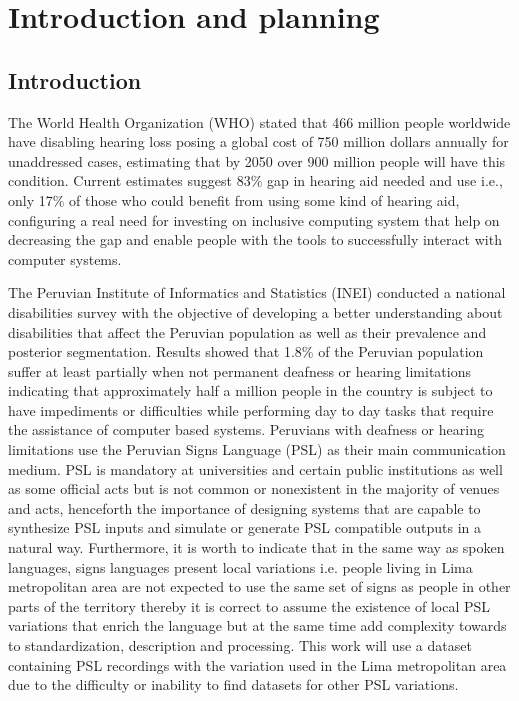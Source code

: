 
\chapter{Introduction and planning} \label{ch-1}

\section{Introduction}

The World Health Organization (WHO) stated that 466 million people worldwide have disabling hearing loss posing a global cost of 750 million dollars annually for unaddressed cases, estimating that by 2050 over 900 million people will have this condition. Current estimates suggest 83\% gap in hearing aid needed and use i.e., only 17\% of those who could benefit from using some kind of hearing aid\cite{deafness_and_hearing_loss_2020}, configuring a real need for investing on inclusive computing system that help on decreasing the gap and enable people with the tools to successfully interact with computer systems.

The Peruvian Institute of Informatics and Statistics (INEI) conducted a national disabilities survey with the objective of developing a better understanding about disabilities that affect the Peruvian population as well as their prevalence and posterior segmentation\cite{disabilities_survey_2012}. Results showed that 1.8\% of the Peruvian population suffer at least partially when not permanent deafness or hearing limitations indicating that approximately half a million people in the country is subject to have impediments or difficulties while performing day to day tasks that require the assistance of computer based systems. Peruvians with deafness or hearing limitations use the Peruvian Signs Language (PSL) as their main communication medium. PSL is mandatory at universities and certain public institutions as well as some official acts but is not common or nonexistent in the majority of venues and acts, henceforth the importance of designing systems that are capable to synthesize PSL inputs and simulate or generate PSL compatible outputs in a natural way. Furthermore, it is worth to indicate that in the same way as spoken languages, signs languages present local variations i.e. people living in Lima metropolitan area are not expected to use the same set of signs as people in other parts of the territory thereby it is correct to assume the existence of local PSL variations that enrich the language but at the same time add complexity towards to standardization, description and processing. This work will use a dataset containing PSL recordings with the variation used in the Lima metropolitan area due to the difficulty or inability to find datasets for other PSL variations.

